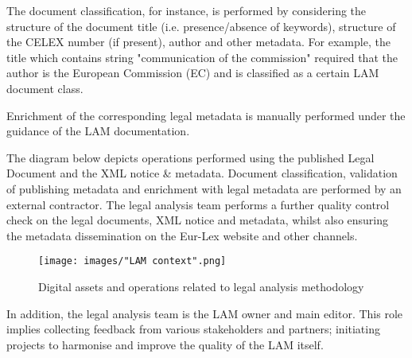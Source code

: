 The document classification, for instance, is performed by considering the structure of the document title (i.e. presence/absence of keywords), structure of the CELEX number (if present), author and other metadata. For example, the title which contains string "communication of the commission" required that the author is the European Commission (EC) and is classified as a certain LAM document class.

Enrichment of the corresponding legal metadata is manually performed under the guidance of the LAM documentation.

The diagram below depicts operations performed using the published Legal Document and the XML notice \& metadata. Document classification, validation of publishing metadata and enrichment with legal metadata are performed by an external contractor. The legal analysis team performs a further quality control check on the legal documents, XML notice and metadata, whilst also ensuring the  metadata dissemination on the Eur-Lex website and other channels.

\begin{figure}[!ht]
\centering
\texttt{[image: images/"LAM context".png]}
\caption{Digital assets and operations related to legal
analysis methodology}
\end{figure}

In addition, the legal analysis team is the LAM owner and main editor.
This role implies collecting feedback from various stakeholders and
partners; initiating projects to harmonise and improve the quality of the
LAM itself.
